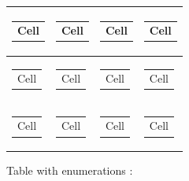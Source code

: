 \begin{longtable}{|l|l|l|l|}
\begin{tabular}[c]{@{}l@{}} Cell \end{tabular} &
\begin{tabular}[c]{@{}l@{}} Cell \end{tabular} &
\begin{tabular}[c]{@{}l@{}} Cell \end{tabular} & 
\begin{tabular}[c]{@{}l@{}} Cell \end{tabular} \\ \hline

\begin{tabular}[c]{@{}l@{}} Cell \end{tabular} &
\begin{tabular}[c]{@{}l@{}} Cell \end{tabular} &
\begin{tabular}[c]{@{}l@{}} Cell \end{tabular} & 
\begin{tabular}[c]{@{}l@{}} Cell \end{tabular} \\ \hline

\begin{tabular}[c]{@{}l@{}} Cell \end{tabular} &
\begin{tabular}[c]{@{}l@{}} Cell \end{tabular} &
\begin{tabular}[c]{@{}l@{}} Cell \end{tabular} & 
\begin{tabular}[c]{@{}l@{}} Cell \end{tabular} \\ \hline

\end{longtable}

\newpage

Table with enumerations : \\

